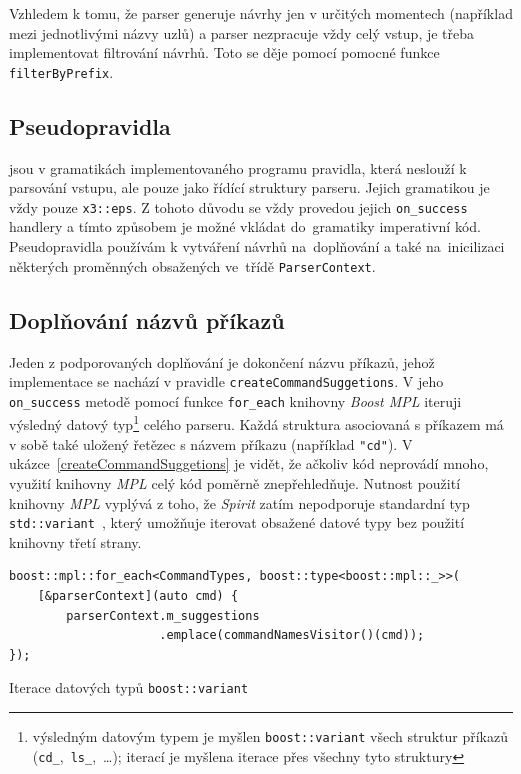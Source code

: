 \documentclass[thesis=B,czech,hidelinks]{FITthesis}[2019/03/06]
\begin{document}
Vzhledem k tomu, že parser generuje návrhy jen v určitých momentech (například mezi jednotlivými názvy uzlů) a parser nezpracuje vždy celý vstup, je třeba implementovat filtrování návrhů. Toto se děje pomocí pomocné funkce \texttt{filterByPrefix}.

\subsection{Pseudopravidla}
 jsou v gramatikách implementovaného programu pravidla, která neslouží k parsování vstupu, ale pouze jako řídící struktury parseru. Jejich gramatikou je vždy pouze \texttt{x3::eps}. Z tohoto důvodu se vždy provedou jejich \texttt{on\_success} handlery a tímto způsobem je možné vkládat do~gramatiky imperativní kód. Pseudopravidla používám k vytváření návrhů na~doplňování a také na~inicilizaci některých proměnných obsažených ve~třídě \texttt{ParserContext}.


\subsection{Doplňování názvů příkazů}\label{completing:commands}
Jeden z podporovaných doplňování je dokončení názvu příkazů, jehož implementace se nachází v pravidle \texttt{createCommandSuggetions}. V jeho \texttt{on\_success} metodě pomocí funkce \texttt{for\_each} knihovny \textit{Boost MPL}\cite{boost:mpl} iteruji výsledný datový typ\footnote{výsledným datovým typem je myšlen \texttt{boost::variant} všech struktur příkazů (\texttt{cd\_},~\texttt{ls\_},~\ldots); iterací je myšlena iterace přes všechny tyto struktury} celého parseru. Každá struktura asociovaná s příkazem má v sobě také uložený řetězec s názvem příkazu (například \verb¨"cd"¨). V ukázce~\ref{createCommandSuggetions} je vidět, že ačkoliv kód neprovádí mnoho, využití knihovny \textit{MPL} celý kód poměrně znepřehledňuje. Nutnost použití knihovny \textit{MPL} vyplývá z toho, že \textit{Spirit} zatím nepodporuje standardní typ \texttt{std::variant}~\cite{boost-variant}, který umožňuje iterovat obsažené datové typy bez použití knihovny třetí strany.

\begin{listing}
\begin{verbatim}
boost::mpl::for_each<CommandTypes, boost::type<boost::mpl::_>>(
    [&parserContext](auto cmd) {
        parserContext.m_suggestions
                     .emplace(commandNamesVisitor()(cmd));
});
\end{verbatim}
\caption{Iterace datových typů \texttt{boost::variant}}\label{createCommandSuggetions}
\end{listing}
\end{document}
